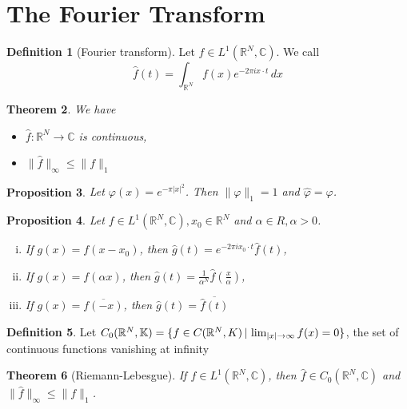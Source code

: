 \documentclass[10pt, oneside, reqno]{amsart}
\theoremstyle{plain}%
\newtheorem{thm}{Theorem}[section]
\newtheorem{prop}[thm]{Proposition}
\theoremstyle{definition}
\newtheorem{defn}[thm]{Definition}
\theoremstyle{remark}
\newcommand{\R}{\mathbb{R}}
\newcommand{\Com}{\mathbb{C}}
\renewcommand{\phi}{\varphi}
\begin{document}
\renewcommand{\hat}{\widehat}

\section{The Fourier Transform} %
\label{sec:the_fourier_transform}

\begin{defn}[Fourier transform]
    Let $f \in L^1(\R^N, \Com)$.  We call \[
        \hat{f}(t) = \int_{\R^N} f(x) e^{-2 \pi i x \cdot t} \, dx
    \]
\end{defn}

\begin{thm}
    We have 
    \begin{itemize}
        \item $\hat{f} : \R^N \rightarrow \Com$ is continuous,
        \item $\|\hat f \|_\infty \leq \|f \|_1$
    \end{itemize}
\end{thm}

\begin{prop}
    Let $\phi(x) = e^{- \pi |x|^2}$.  Then $\|\phi \|_1 = 1$ and $\hat \phi = \phi$.
\end{prop}

\begin{prop}
    Let $f \in L^1(\R^N, \Com), x_0 \in \R^N$ and $\alpha \in R, \alpha > 0$. 
    \begin{enumerate}[(i)]
        \item If $g(x) = f(x - x_0)$, then $\hat g (t) = e^{-2 \pi i x_0 \cdot t} \hat f (t)$,
        \item If $g(x) = f(\alpha x)$, then $\hat g (t) = \frac{1}{\alpha^N} \hat f \left( \frac{x}{\alpha}\right)$,
        \item \vspace{0.1cm} If $g(x) = \overline{f(-x)}$, then $\hat g (t) = \overline{\hat f(t)}$
    \end{enumerate}
\end{prop}

\begin{defn}
    Let $C_0(\R^N, \K) = \{ f \in C(\R^N, K) \, | \, \lim_{|x| \rightarrow \infty} f(x) = 0 \}$, the set of continuous functions vanishing at infinity
\end{defn}

\begin{thm}[Riemann-Lebesgue]
    If $f \in L^1(\R^N, \Com)$, then $\hat f \in C_0(\R^N, \Com)$ and $\| \hat f \|_\infty \leq \|f \|_1$.
\end{thm}
\end{document}
